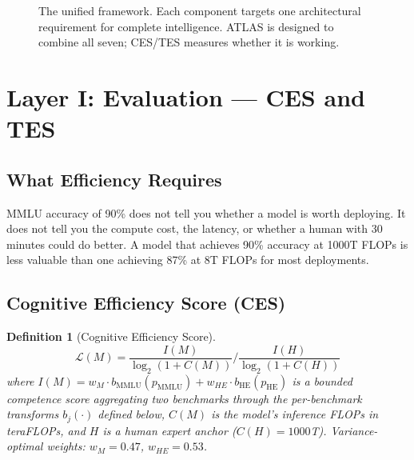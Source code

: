 \documentclass[12pt]{article}
\newtheorem{definition}{Definition}
\begin{document}
\begin{figure}[H]
{%
}
\caption{The unified framework. Each component targets one architectural requirement for complete intelligence. ATLAS is designed to combine all seven; CES/TES measures whether it is working.}
\label{fig:framework}
\end{figure}

\section{Layer I: Evaluation --- CES and TES}
\label{sec:eval}

\subsection{What Efficiency Requires}

MMLU accuracy of 90\% does not tell you whether a model is worth deploying. It does not tell you the compute cost, the latency, or whether a human with 30 minutes could do better. A model that achieves 90\% accuracy at 1000T FLOPs is less valuable than one achieving 87\% at 8T FLOPs for most deployments.

\subsection{Cognitive Efficiency Score (CES)}

\begin{definition}[Cognitive Efficiency Score]
\begin{equation}
\mathcal{L}(M) = \frac{I(M)}{\log_2(1 + C(M))} \bigg/ \frac{I(H)}{\log_2(1 + C(H))}
\end{equation}
where $I(M) = w_M \cdot b_{\text{MMLU}}(p_{\text{MMLU}}) + w_{HE} \cdot b_{\text{HE}}(p_{\text{HE}})$ is a bounded competence score aggregating two benchmarks through the per-benchmark transforms $b_j(\cdot)$ defined below, $C(M)$ is the model's inference FLOPs in teraFLOPs, and $H$ is a human expert anchor ($C(H) = 1000$T). Variance-optimal weights: $w_M = 0.47$, $w_{HE} = 0.53$.
\end{definition}
\end{document}
